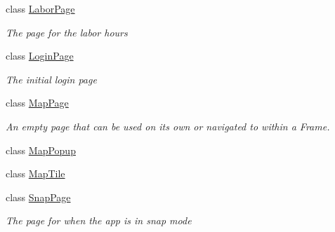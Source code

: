 \begin{DoxyCompactItemize}
class \hyperlink{class_field_service_1_1_win_r_t_1_1_views_1_1_labor_page}{Labor\+Page}
\begin{DoxyCompactList}\small\item\em The page for the labor hours \end{DoxyCompactList}\item 
class \hyperlink{class_field_service_1_1_win_r_t_1_1_views_1_1_login_page}{Login\+Page}
\begin{DoxyCompactList}\small\item\em The initial login page \end{DoxyCompactList}\item 
class \hyperlink{class_field_service_1_1_win_r_t_1_1_views_1_1_map_page}{Map\+Page}
\begin{DoxyCompactList}\small\item\em An empty page that can be used on its own or navigated to within a Frame. \end{DoxyCompactList}\item 
class \hyperlink{class_field_service_1_1_win_r_t_1_1_views_1_1_map_popup}{Map\+Popup}
\item 
class \hyperlink{class_field_service_1_1_win_r_t_1_1_views_1_1_map_tile}{Map\+Tile}
\item 
class \hyperlink{class_field_service_1_1_win_r_t_1_1_views_1_1_snap_page}{Snap\+Page}
\begin{DoxyCompactList}\small\item\em The page for when the app is in snap mode \end{DoxyCompactList}\end{DoxyCompactItemize}
